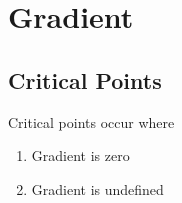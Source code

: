 \chapter{Gradient}

\section{Critical Points}

  Critical points occur where

  \begin{enumerate}
    \item Gradient is zero
    \item Gradient is undefined
  \end{enumerate}
